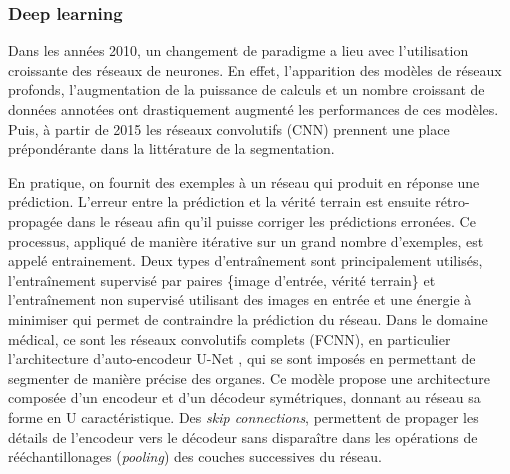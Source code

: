       \subsubsection{Deep learning}
      Dans les années 2010, un changement de paradigme a lieu avec l'utilisation croissante des réseaux de neurones. En effet, l'apparition des modèles de réseaux profonds, l'augmentation de la puissance de calculs et un nombre croissant de données annotées ont drastiquement augmenté les performances de ces modèles. Puis, à partir de 2015 les réseaux convolutifs (CNN) prennent une place prépondérante dans la littérature de la segmentation. 
      
      En pratique, on fournit des exemples à un réseau qui produit en réponse une prédiction. L'erreur entre la prédiction et la vérité terrain est ensuite rétro-propagée dans le réseau afin qu'il puisse corriger les prédictions erronées. Ce processus, appliqué de manière itérative sur un grand nombre d'exemples, est appelé entrainement. Deux types d'entraînement sont principalement utilisés, l'entraînement supervisé par paires \{image d'entrée, vérité terrain\} et l'entraînement non supervisé utilisant des images en entrée et une énergie à minimiser qui permet de contraindre la prédiction du réseau.
      Dans le domaine médical, ce sont les réseaux convolutifs complets (FCNN), en particulier l'architecture d'auto-encodeur U-Net \cite{Ronneberger2015_Unet}, qui se sont imposés en permettant de segmenter de manière précise des organes. Ce modèle propose une architecture composée d'un encodeur et d'un décodeur symétriques, donnant au réseau sa forme en U caractéristique. Des \textit{skip connections}, permettent de propager les détails de l'encodeur vers le décodeur sans disparaître dans les opérations de rééchantillonages (\textit{pooling}) des couches successives du réseau.

